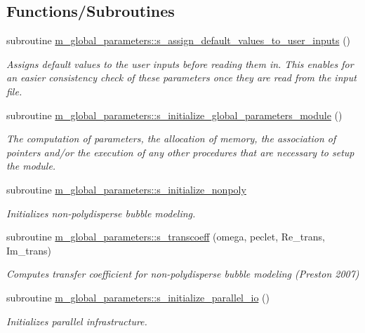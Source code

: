 \subsection*{Functions/\+Subroutines}
\begin{DoxyCompactItemize}
\item 
subroutine \hyperlink{namespacem__global__parameters_a433eac37597eb46a3cac84ca0471f5d3}{m\+\_\+global\+\_\+parameters\+::s\+\_\+assign\+\_\+default\+\_\+values\+\_\+to\+\_\+user\+\_\+inputs} ()
\begin{DoxyCompactList}\small\item\em Assigns default values to the user inputs before reading them in. This enables for an easier consistency check of these parameters once they are read from the input file. \end{DoxyCompactList}\item 
subroutine \hyperlink{namespacem__global__parameters_a8a76198d180cb9736c21dde108cb0dbf}{m\+\_\+global\+\_\+parameters\+::s\+\_\+initialize\+\_\+global\+\_\+parameters\+\_\+module} ()
\begin{DoxyCompactList}\small\item\em The computation of parameters, the allocation of memory, the association of pointers and/or the execution of any other procedures that are necessary to setup the module. \end{DoxyCompactList}\item 
subroutine \hyperlink{namespacem__global__parameters_a1611e2cf82243c04b04a11281ef67993}{m\+\_\+global\+\_\+parameters\+::s\+\_\+initialize\+\_\+nonpoly}
\begin{DoxyCompactList}\small\item\em Initializes non-\/polydisperse bubble modeling. \end{DoxyCompactList}\item 
subroutine \hyperlink{namespacem__global__parameters_af52b102f1c17e28aa4ca3070f8806ca6}{m\+\_\+global\+\_\+parameters\+::s\+\_\+transcoeff} (omega, peclet, Re\+\_\+trans, Im\+\_\+trans)
\begin{DoxyCompactList}\small\item\em Computes transfer coefficient for non-\/polydisperse bubble modeling (Preston 2007) \end{DoxyCompactList}\item 
subroutine \hyperlink{namespacem__global__parameters_a54905a7a2ce9e15fc33ebac52c0d3c27}{m\+\_\+global\+\_\+parameters\+::s\+\_\+initialize\+\_\+parallel\+\_\+io} ()
\begin{DoxyCompactList}\small\item\em Initializes parallel infrastructure. \end{DoxyCompactList}\item 

\end{DoxyCompactItemize}
